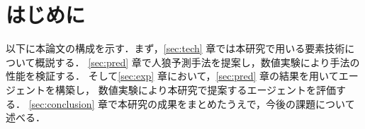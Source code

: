 \newpage
\changeindent{0cm}
\section{はじめに}
\label{sec:intro}
\changeindent{2cm}


以下に本論文の構成を示す．まず，\ref{sec:tech} 章では本研究で用いる要素技術について概説する．
\ref{sec:pred} 章で人狼予測手法を提案し，数値実験により手法の性能を検証する．
そして\ref{sec:exp} 章において，\ref{sec:pred} 章の結果を用いてエージェントを構築し，
数値実験により本研究で提案するエージェントを評価する．
\ref{sec:conclusion} 章で本研究の成果をまとめたうえで，今後の課題について述べる．


\begin{comment}
\end{comment}